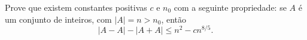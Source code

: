 Prove que existem constantes positivas $c$ e $n_0$ com a seguinte propriedade: se $A$ é um conjunto de inteiros, com $|A| = n > n_0$, então
\[ |A - A| - |A + A| \leq n^2 - c n^{8/5}.\]
